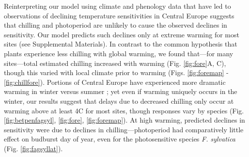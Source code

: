 \documentclass{article}
\begin{document}
\par Reinterpreting our model using climate and phenology data that have led to observations of declining temperature sensitivities in Central Europe suggests that chilling and photoperiod are unlikely to cause the observed declines in sensitivity. Our model predicts such declines only at extreme warming for most sites (see Supplemental Materials). In contrast to the common hypothesis that plants experience less chilling with global warming, we found that---for many sites---total estimated chilling increased with warming (Fig. \ref{fig:fore}A, C), though this varied with local climate prior to warming (Figs. \ref{fig:foremap} - \ref{fig:chillfore}). 
Portions of Central Europe have experienced more dramatic warming in winter versus summer \emph{\citep{balling1998}}; yet even if warming uniquely occurs in the winter, our results suggest that delays due to decreased chilling only occur at warming above at least 4\degree C for most sites, though responses vary by species (Fig. \ref{fig:betpenfagsyl}, \ref{fig:fore}, \ref{fig:foremap}). At high warming, predicted declines in sensitivity were due to declines in chilling---photoperiod had comparatively little effect on budburst day of year, even for the photosensitive species \emph{F. sylvatica} (Fig. \ref{fig:fagsyllat}). 
\end{document}

